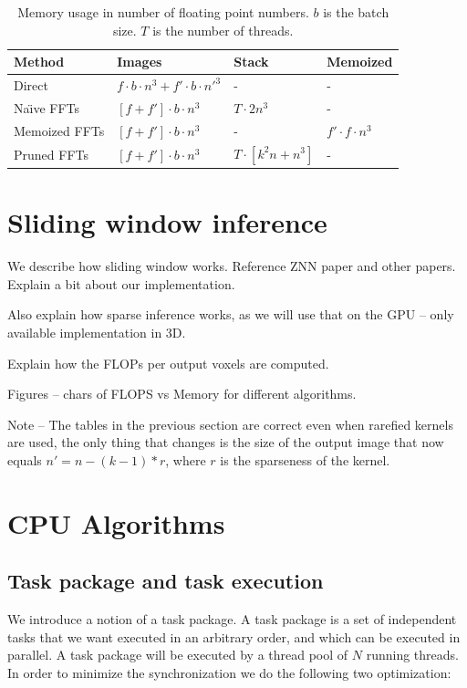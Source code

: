 \documentclass[conference]{IEEEtran}
\begin{document}
\begin{table}
  \centering
  \begin{tabular}{llll}
    \hline
    Method    &Images   &Stack   &Memoized
    \\ \hline
    Direct & $f \cdot b \cdot n^3 + f' \cdot b \cdot n'^3$ & - & -
    \\
    Na\"{\i}ve FFTs & $[f + f'] \cdot b \cdot  n^3$ & $T \cdot 2n^3$ & -
    \\
    Memoized FFTs & $[f + f'] \cdot b \cdot  n^3$ & - & $f' \cdot f \cdot n^3$
    \\
    Pruned FFTs & $[f + f'] \cdot b \cdot  n^3$ & $T \cdot [k^2n + n^3]$ & -
    \\ \hline
  \end{tabular}
  \caption{Memory usage in number of floating point numbers. $b$ is
    the batch size.  $T$ is the number of threads.}
  \label{table:conv_memory}
\end{table}

\section{Sliding window inference}

We describe how sliding window works.  Reference ZNN paper and other
papers.  Explain a bit about our implementation.

Also explain how sparse inference works, as we will use that on the
GPU -- only available implementation in 3D.

Explain how the FLOPs per output voxels are computed.

Figures -- chars of FLOPS vs Memory for different algorithms.

Note -- The tables in the previous section are correct even when
rarefied kernels are used, the only thing that changes is the size of
the output image that now equals $n' = n - (k-1)*r$, where $r$ is the
sparseness of the kernel.

\section{CPU Algorithms}

\subsection{Task package and task execution}

We introduce a notion of a task package.  A task package is a set of
independent tasks that we want executed in an arbitrary order, and
which can be executed in parallel.  A task package will be executed by
a thread pool of $N$ running threads.  In order to minimize the
synchronization we do the following two optimization:
\end{document}
